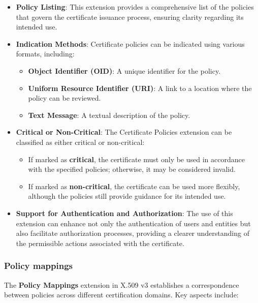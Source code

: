 \begin{itemize}
  \item \textbf{Policy Listing}: This extension provides a
    comprehensive list of the policies that govern the certificate
    issuance process, ensuring clarity regarding its intended use.

  \item \textbf{Indication Methods}: Certificate policies can be
    indicated using various formats, including:
    \begin{itemize}
      \item \textbf{Object Identifier (OID)}: A unique identifier for
        the policy.
      \item \textbf{Uniform Resource Identifier (URI)}: A link to a
        location where the policy can be reviewed.
      \item \textbf{Text Message}: A textual description of the
        policy.
    \end{itemize}

  \item \textbf{Critical or Non-Critical}: The Certificate Policies
    extension can be classified as either critical or non-critical:
    \begin{itemize}
      \item If marked as \textbf{critical}, the certificate must only
        be used in accordance with the specified policies; otherwise,
        it may be considered invalid.
      \item If marked as \textbf{non-critical}, the certificate can be
        used more flexibly, although the policies still provide
        guidance for its intended use.
    \end{itemize}

  \item \textbf{Support for Authentication and Authorization}: The use
    of this extension can enhance not only the authentication of users
    and entities but also facilitate authorization processes,
    providing a clearer understanding of the permissible actions
    associated with the certificate.
\end{itemize}

\subsubsection{Policy mappings}

The \textbf{Policy Mappings} extension in X.509 v3 establishes a
correspondence between policies across different certification
domains. Key aspects include:

